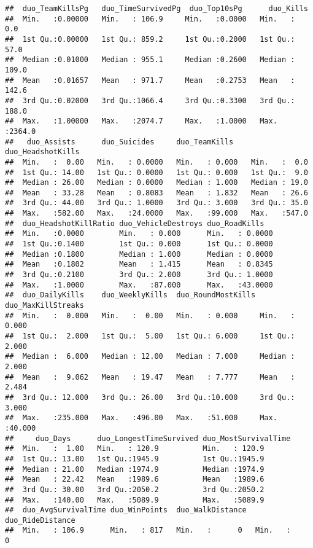 \documentclass[]{article}
\begin{document}
\begin{verbatim}
##  duo_TeamKillsPg   duo_TimeSurvivedPg  duo_Top10sPg      duo_Kills     
##  Min.   :0.00000   Min.   : 106.9     Min.   :0.0000   Min.   :   0.0  
##  1st Qu.:0.00000   1st Qu.: 859.2     1st Qu.:0.2000   1st Qu.:  57.0  
##  Median :0.01000   Median : 955.1     Median :0.2600   Median : 109.0  
##  Mean   :0.01657   Mean   : 971.7     Mean   :0.2753   Mean   : 142.6  
##  3rd Qu.:0.02000   3rd Qu.:1066.4     3rd Qu.:0.3300   3rd Qu.: 188.0  
##  Max.   :1.00000   Max.   :2074.7     Max.   :1.0000   Max.   :2364.0  
##   duo_Assists      duo_Suicides     duo_TeamKills    duo_HeadshotKills
##  Min.   :  0.00   Min.   : 0.0000   Min.   : 0.000   Min.   :  0.0    
##  1st Qu.: 14.00   1st Qu.: 0.0000   1st Qu.: 0.000   1st Qu.:  9.0    
##  Median : 26.00   Median : 0.0000   Median : 1.000   Median : 19.0    
##  Mean   : 33.28   Mean   : 0.8083   Mean   : 1.832   Mean   : 26.6    
##  3rd Qu.: 44.00   3rd Qu.: 1.0000   3rd Qu.: 3.000   3rd Qu.: 35.0    
##  Max.   :582.00   Max.   :24.0000   Max.   :99.000   Max.   :547.0    
##  duo_HeadshotKillRatio duo_VehicleDestroys duo_RoadKills    
##  Min.   :0.0000        Min.   : 0.000      Min.   : 0.0000  
##  1st Qu.:0.1400        1st Qu.: 0.000      1st Qu.: 0.0000  
##  Median :0.1800        Median : 1.000      Median : 0.0000  
##  Mean   :0.1802        Mean   : 1.415      Mean   : 0.8345  
##  3rd Qu.:0.2100        3rd Qu.: 2.000      3rd Qu.: 1.0000  
##  Max.   :1.0000        Max.   :87.000      Max.   :43.0000  
##  duo_DailyKills    duo_WeeklyKills  duo_RoundMostKills duo_MaxKillStreaks
##  Min.   :  0.000   Min.   :  0.00   Min.   : 0.000     Min.   : 0.000    
##  1st Qu.:  2.000   1st Qu.:  5.00   1st Qu.: 6.000     1st Qu.: 2.000    
##  Median :  6.000   Median : 12.00   Median : 7.000     Median : 2.000    
##  Mean   :  9.062   Mean   : 19.47   Mean   : 7.777     Mean   : 2.484    
##  3rd Qu.: 12.000   3rd Qu.: 26.00   3rd Qu.:10.000     3rd Qu.: 3.000    
##  Max.   :235.000   Max.   :496.00   Max.   :51.000     Max.   :40.000    
##     duo_Days      duo_LongestTimeSurvived duo_MostSurvivalTime
##  Min.   :  1.00   Min.   : 120.9          Min.   : 120.9      
##  1st Qu.: 13.00   1st Qu.:1945.9          1st Qu.:1945.9      
##  Median : 21.00   Median :1974.9          Median :1974.9      
##  Mean   : 22.42   Mean   :1989.6          Mean   :1989.6      
##  3rd Qu.: 30.00   3rd Qu.:2050.2          3rd Qu.:2050.2      
##  Max.   :140.00   Max.   :5089.9          Max.   :5089.9      
##  duo_AvgSurvivalTime duo_WinPoints  duo_WalkDistance  duo_RideDistance 
##  Min.   : 106.9      Min.   : 817   Min.   :      0   Min.   :      0  

\end{verbatim}
\end{document}

